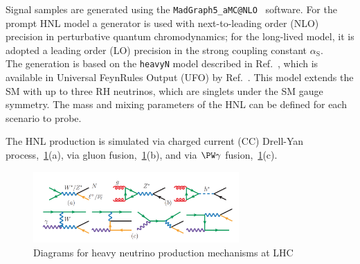 Signal samples are generated using the
\texttt{MadGraph5\_aMC@NLO}~\cite{Alwall_2014} software. 
For the prompt HNL
model a generator is used with next-to-leading order (NLO) precision
in perturbative quantum chromodynamics; for the long-lived model, it
is adopted a leading order (LO) precision in the strong
coupling constant $\alpha_{\mathrm{S}}$.\\
The generation is based on the \texttt{heavyN} model described in
Ref.~\cite{Atre:2009rg}, which is available in Universal FeynRules
Output (UFO) by Ref.~\cite{Alva:2014gxa,Degrande_2016,heavyN}.
This model extends the SM with up to three RH neutrinos,
which are singlets under the SM gauge symmetry.
The mass and mixing parameters of the HNL can be defined for each
scenario to probe.

The HNL production is simulated via charged current (CC) Drell-Yan
process,~\ref{fid:hnl_production}(a), via gluon
fusion,~\ref{fid:hnl_production}(b), and via $\PW \gamma$
fusion,~\ref{fid:hnl_production}(c). 
\begin{figure}[h!]
\centering
 \includegraphics[clip,trim=0cm 0cm 0cm 1cm, width=0.70\textwidth]{Figures/c4/hnl_production}
  \caption{Diagrams for heavy neutrino production mechanisms at LHC~\cite{Pascoli_2019}}
  \label{fid:hnl_production}
\end{figure}

